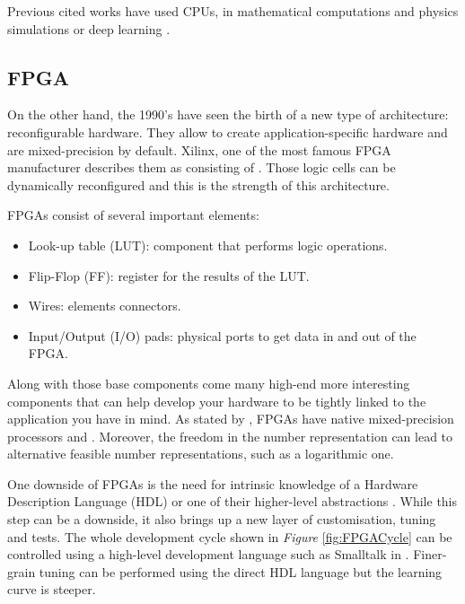 
Previous cited works have used CPUs, in mathematical computations and physics simulations \cite{Goddeke2007, Baboulin2009, Clark2010, LeGrand2013, Haidar2018, Ichimura2018} or deep learning \cite{Goddeke2007, Baboulin2009, Micikevicius2017, Jia2018, Ichimura2018}.


\subsection{FPGA}

On the other hand, the 1990's have seen the birth of a new type of architecture: reconfigurable hardware. They allow to create application-specific hardware and are mixed-precision by default. Xilinx, one of the most famous FPGA manufacturer describes them as consisting of  \cite{Xilinx2017}. Those logic cells can be dynamically reconfigured and this is the strength of this architecture.

FPGAs consist of several important elements:
\begin{itemize}
  \item Look-up table (LUT): component that performs logic operations.
  \item Flip-Flop (FF): register  for the results of the LUT.
  \item Wires: elements connectors.
  \item Input/Output (I/O) pads: physical ports to get data in and out of the FPGA.
\end{itemize}

Along with those base components come many high-end more interesting components that can help develop your hardware to be tightly linked to the application you have in mind. As stated by \cite{Goddeke2007}, FPGAs have native mixed-precision processors and . Moreover, the freedom in the number representation can lead to alternative feasible number representations, such as a logarithmic one.

One downside of FPGAs is the need for intrinsic knowledge of a Hardware Description Language (HDL) or one of their higher-level abstractions \cite{XuanSang2014}. While this step can be a downside, it also brings up a new layer of customisation, tuning and tests. The whole development cycle shown in \emph{Figure} \ref{fig:FPGACycle} can be controlled using a high-level development language such as Smalltalk in \cite{XuanSang2014}. Finer-grain tuning can be performed using the direct HDL language but the learning curve is steeper.

